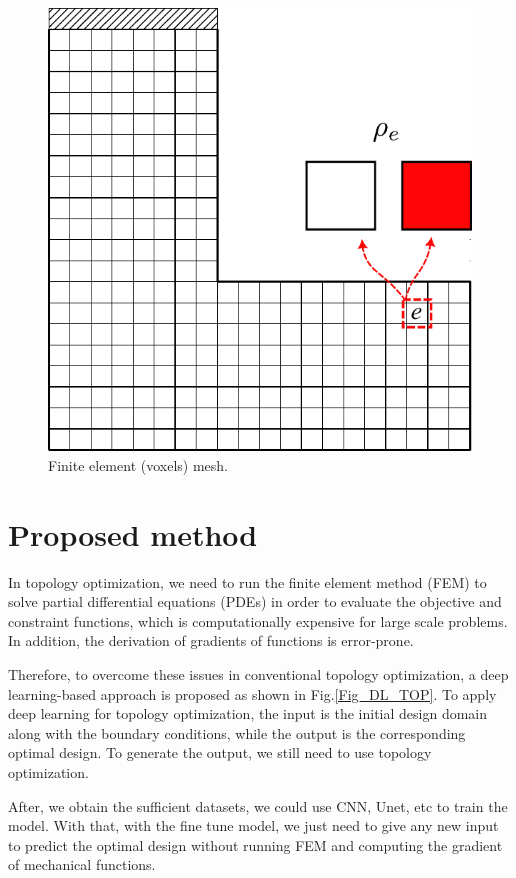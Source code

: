 \documentclass{article} %
\begin{document}
\begin{figure}[htp!]
		\centering
		\includegraphics[scale=0.35]{TOP_Variables.pdf}
	\caption{Finite element (voxels) mesh.}
	\label{Fig_Lbracket2d_Mesh}
\end{figure}
\section{Proposed method}
In topology optimization, we need to run the finite element method (FEM) to solve partial differential equations (PDEs) in order to evaluate the objective and constraint functions, which is computationally expensive for large scale problems. In addition, the derivation of gradients of functions is error-prone. 

Therefore, to overcome these issues in conventional topology optimization, a deep learning-based approach is proposed as shown in Fig.\ref{Fig_DL_TOP}.
To apply deep learning for topology optimization, the input is the initial design domain along with the boundary conditions, while the output is the corresponding optimal design. To generate the output, we still need to use topology optimization. 

After, we obtain the sufficient datasets, we could use CNN, Unet, etc to train the model. With that, with the fine tune model, we just need to give any new input to predict the optimal design without running FEM and computing the gradient of mechanical functions.
\end{document}
